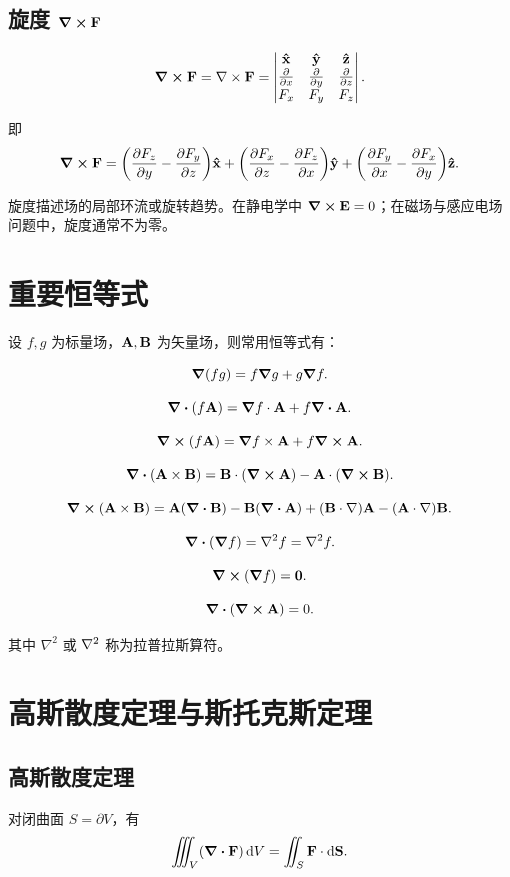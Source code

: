 \subsection{旋度 $\curl \vb{F}$}

\[
\curl \vb{F}=\nabla\times\vb{F}=
\begin{vmatrix}
\vu{x} & \vu{y} & \vu{z}\\
\pdv{}{x} & \pdv{}{y} & \pdv{}{z}\\
F_x & F_y & F_z
\end{vmatrix}.
\]

即
\[
\curl \vb{F}=
\qty(\pdv{F_z}{y}-\pdv{F_y}{z})\vu{x}
+\qty(\pdv{F_x}{z}-\pdv{F_z}{x})\vu{y}
+\qty(\pdv{F_y}{x}-\pdv{F_x}{y})\vu{z}.
\]

旋度描述场的局部环流或旋转趋势。在静电学中 $\curl \vb{E}=0$；在磁场与感应电场问题中，旋度通常不为零。

\section{重要恒等式}

设 $f,g$ 为标量场，$\vb{A},\vb{B}$ 为矢量场，则常用恒等式有：

\[
\grad(fg)=f\grad g+g\grad f.
\]

\[
\div(f\vb{A})=\grad f\cdot \vb{A}+f\div \vb{A}.
\]

\[
\curl(f\vb{A})=\grad f\times \vb{A}+f\curl \vb{A}.
\]

\[
\div(\vb{A}\times\vb{B})=\vb{B}\cdot(\curl \vb{A})-\vb{A}\cdot(\curl \vb{B}).
\]

\[
\curl(\vb{A}\times\vb{B})=\vb{A}(\div \vb{B})-\vb{B}(\div \vb{A})+(\vb{B}\cdot\nabla)\vb{A}-(\vb{A}\cdot\nabla)\vb{B}.
\]

\[
\div(\grad f)=\nabla^2 f=\laplacian f.
\]

\[
\curl(\grad f)=\vb{0}.
\]

\[
\div(\curl \vb{A})=0.
\]

其中 $\nabla^2$ 或 $\laplacian$ 称为拉普拉斯算符。

\section{高斯散度定理与斯托克斯定理}

\subsection{高斯散度定理}

对闭曲面 $S=\partial V$，有
\[
\iiint_V (\div \vb{F})\,\dd V=\iint_{S} \vb{F}\cdot \dd \vb{S}.
\]

